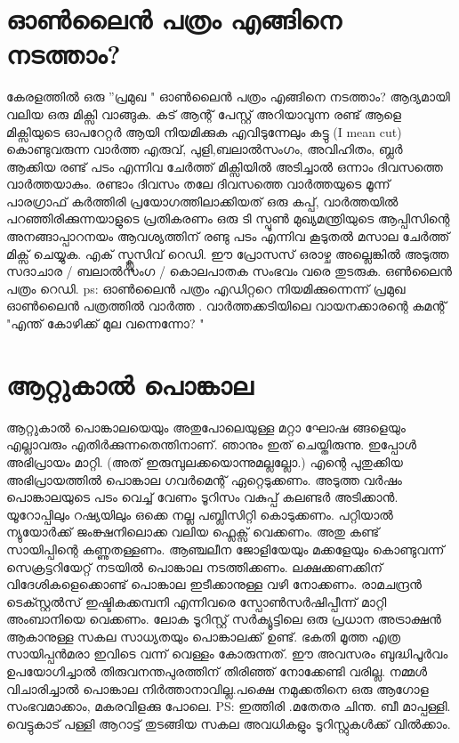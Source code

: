 \documentclass[10pt,a4paper]{report}
\begin{document}
    \section{ ഓൺലൈൻ പത്രം എങ്ങിനെ നടത്താം? }
    കേരളത്തിൽ ഒരു ''പ്രമുഖ " ഓൺലൈൻ പത്രം എങ്ങിനെ നടത്താം? ആദ്യമായി വലിയ ഒരു മിക്സി വാങ്ങുക. കട് ആന്റ് പേസ്റ്റ് അറിയാവുന്ന രണ്ട് ആളെ മിക്സിയുടെ ഓപറേറ്റർ ആയി നിയമിക്കുക എവിടുന്നേലും കട്ടു (I mean cut) കൊണ്ടുവരുന്ന വാർത്ത എരുവ്, പുളി,ബലാൽസംഗം, അവിഹിതം, ബ്ലർ ആക്കിയ രണ്ട് പടം എന്നിവ ചേർത്ത് മിക്സിയിൽ അടിച്ചാൽ ഒന്നാം ദിവസത്തെ വാർത്തയാകും. രണ്ടാം ദിവസം തലേ ദിവസത്തെ വാർത്തയുടെ മൂന്ന് പാരഗ്രാഫ് കർത്തിരി പ്രയോഗത്തിലാക്കിയത് ഒരു കപ്പ്‌, വാർത്തയിൽ പറഞ്ഞിരിക്കുന്നയാളുടെ പ്രതികരണം ഒരു ടി സ്പൂൺ മുഖ്യമന്ത്രിയുടെ ആപ്പിസിന്റെ അനങ്ങാപ്പാറനയം ആവശ്യത്തിന് രണ്ടു പടം എന്നിവ കൂടുതൽ മസാല ചേർത്ത് മിക്സ് ചെയ്യുക. എക് സ്ക്ലൂസിവ് റെഡി. ഈ പ്രോസസ് ഒരാഴ്ച അല്ലെങ്കിൽ അടുത്ത സദാചാര / ബലാൽസംഗ / കൊലപാതക സംഭവം വരെ തുടരുക. ഒൺലൈൻ പത്രം റെഡി. ps: ഓൺലൈൻ പത്രം എഡിറ്ററെ നിയമിക്കുന്നെന്ന് പ്രമുഖ ഓൺലൈൻ പത്രത്തിൽ വാർത്ത . വാർത്തക്കടിയിലെ വായനക്കാരന്റെ കമന്റ് "എന്ത് കോഴിക്ക് മുല വന്നെന്നോ? "
    
\section{ആറ്റുകാൽ പൊങ്കാല}
ആറ്റുകാൽ പൊങ്കാലയെയും അതുപോലെയുള്ള മറ്റാ ഘോഷ ങ്ങളെയും എല്ലാവരും എതിർക്കുന്നതെന്തിനാണ്. ഞാനും ഇത് ചെയ്തിരുന്നു. ഇപ്പോൾ അഭിപ്രായം മാറ്റി. (അത് ഇരുമ്പുലക്കയൊന്നുമല്ലല്ലോ.) എന്റെ പുതുക്കിയ അഭിപ്രായത്തിൽ പൊങ്കാല ഗവർമെന്റ് ഏറ്റെടുക്കണം. അടുത്ത വർഷം പൊങ്കാലയുടെ പടം വെച്ച് വേണം ടൂറിസം വകുപ്പ് കലണ്ടർ അടിക്കാൻ. യൂറോപ്പിലും റഷ്യയിലും ഒക്കെ നല്ല പബ്ലിസിറ്റി കൊടുക്കണം. പറ്റിയാൽ ന്യുയോർക്ക് ജംങ്ക്ഷനിലൊക്ക വലിയ ഫ്ലെക്സ് വെക്കണം. അതു കണ്ട് സായിപ്പിന്റെ കണ്ണുതള്ളണം. ആഞ്ചലീന ജോളിയേയും മക്കളേയും കൊണ്ടുവന്ന് സെക്രട്ടറിയേറ്റ് നടയിൽ പൊങ്കാല നടത്തിക്കണം. ലക്ഷക്കണക്കിന് വിദേശികളെക്കൊണ്ട് പൊങ്കാല ഇടീക്കാനുള്ള വഴി നോക്കണം. രാമചന്ദ്രൻ ടെക്സ്റ്റൽസ് ഇഷ്ടികക്കമ്പനി എന്നിവരെ സ്പോൺസർഷിപ്പീന്ന് മാറ്റി അംബാനിയെ വെക്കണം. ലോക ടൂറിസ്റ്റ് സർക്യൂട്ടിലെ ഒരു പ്രധാന അട്രാക്ഷൻ ആകാനുള്ള സകല സാധ്യതയും പൊങ്കാലക്ക് ഉണ്ട്. ഭകതി മൂത്ത എത്ര സായിപ്പൻമരാ ഇവിടെ വന്ന് വെള്ളം കോരുന്നത്. ഈ അവസരം ബുദ്ധിപൂർവം ഉപയോഗിച്ചാൽ തിരുവനന്തപുരത്തിന് തിരിഞ്ഞ് നോക്കേണ്ടി വരില്ല. നമ്മൾ വിചാരിച്ചാൽ പൊങ്കാല നിർത്താനാവില്ല.പക്ഷെ നമുക്കതിനെ ഒരു ആഗോള സംഭവമാക്കാം, മകരവിളക്കു പോലെ. PS:  ഇത്തിരി .മതേതര ചിന്ത. ബീ മാപ്പള്ളി. വെട്ടുകാട് പള്ളി ആറാട്ട് തുടങ്ങിയ സകല അവധികളും ടൂറിസ്റ്റുകൾക്ക് വിൽക്കാം.
\end{document}
